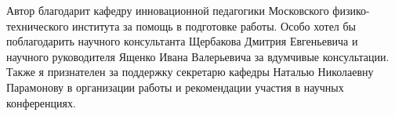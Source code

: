 Автор благодарит кафедру инновационной педагогики Московского физико-технического института за помощь 
в подготовке работы. Особо хотел бы поблагодарить
научного консультанта Щербакова Дмитрия Евгеньевича и научного руководителя Ященко Ивана Валерьевича за вдумчивые консультации.
Также я признателен за поддержку секретарю кафедры Наталью Николаевну Парамонову в организации работы 
и рекомендации участия в научных конференциях. 
